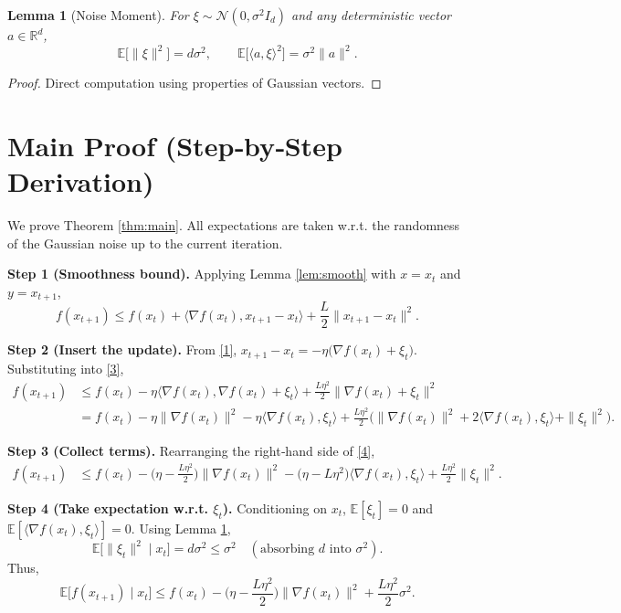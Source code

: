 \documentclass{article}
\newtheorem{lemma}{Lemma}
\newcommand{\E}{\mathbb{E}}
\newcommand{\R}{\mathbb{R}}
\begin{document}
\begin{lemma}[Noise Moment]\label{lem:noise}
For $\xi\sim\mathcal N(0,\sigma^{2}I_{d})$ and any deterministic vector $a\in\R^{d}$,
\[
\E\big[\|\xi\|^{2}\big]=d\sigma^{2},\qquad
\E\big[\langle a,\xi\rangle^{2}\big]=\sigma^{2}\|a\|^{2}.
\tag{L2}
\]
\end{lemma}
\begin{proof}
Direct computation using properties of Gaussian vectors. \qedhere
\end{proof}

\section*{Main Proof (Step‑by‑Step Derivation)}
We prove Theorem \ref{thm:main}. All expectations are taken w.r.t. the
randomness of the Gaussian noise up to the current iteration.

\noindent\textbf{Step 1 (Smoothness bound).}  
Applying Lemma \ref{lem:smooth} with $x=x_{t}$ and $y=x_{t+1}$,
\[
f(x_{t+1})\le f(x_{t})+\langle\nabla f(x_{t}),x_{t+1}-x_{t}\rangle
               +\frac{L}{2}\|x_{t+1}-x_{t}\|^{2}.
\tag{3}
\]

\noindent\textbf{Step 2 (Insert the update).}  
From \eqref{1},
$x_{t+1}-x_{t}= -\eta\big(\nabla f(x_{t})+\xi_{t}\big)$. Substituting into \eqref{3},
\[
\begin{aligned}
f(x_{t+1})
&\le f(x_{t})-\eta\langle\nabla f(x_{t}),\nabla f(x_{t})+\xi_{t}\rangle
      +\frac{L\eta^{2}}{2}\|\nabla f(x_{t})+\xi_{t}\|^{2} \\
&= f(x_{t})-\eta\|\nabla f(x_{t})\|^{2}
      -\eta\langle\nabla f(x_{t}),\xi_{t}\rangle
      +\frac{L\eta^{2}}{2}\big(\|\nabla f(x_{t})\|^{2}+2\langle\nabla f(x_{t}),\xi_{t}\rangle
      +\|\xi_{t}\|^{2}\big).
\end{aligned}
\tag{4}
\]

\noindent\textbf{Step 3 (Collect terms).}  
Rearranging the right‑hand side of \eqref{4},
\[
\begin{aligned}
f(x_{t+1})
&\le f(x_{t})
   -\Big(\eta-\frac{L\eta^{2}}{2}\Big)\|\nabla f(x_{t})\|^{2}
   -\Big(\eta-\!L\eta^{2}\Big)\langle\nabla f(x_{t}),\xi_{t}\rangle
   +\frac{L\eta^{2}}{2}\|\xi_{t}\|^{2}.
\end{aligned}
\tag{5}
\]

\noindent\textbf{Step 4 (Take expectation w.r.t. $\xi_{t}$).}  
Conditioning on $x_{t}$, $\E[\xi_{t}]=0$ and $\E[\langle\nabla f(x_{t}),\xi_{t}\rangle]=0$.
Using Lemma \ref{lem:noise},
\[
\E\big[\|\xi_{t}\|^{2}\mid x_{t}\big]=d\sigma^{2}\le \sigma^{2} \quad(\text{absorbing $d$ into }\sigma^{2}).
\]
Thus,
\[
\E\!\big[f(x_{t+1})\mid x_{t}\big]
\le f(x_{t})
   -\Big(\eta-\frac{L\eta^{2}}{2}\Big)\|\nabla f(x_{t})\|^{2}
   +\frac{L\eta^{2}}{2}\sigma^{2}.
\tag{6}
\]
\end{document}
